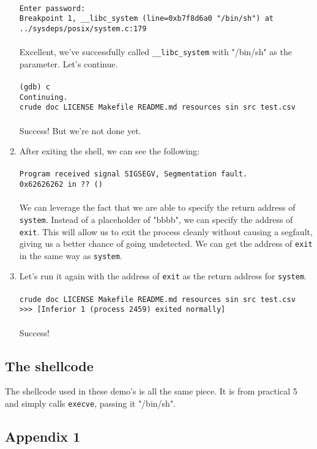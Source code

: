 \documentclass[]{article}
\begin{document}
\begin{enumerate}
	\\
	\texttt{Enter password:\\
		Breakpoint 1, \_\_libc\_system (line=0xb7f8d6a0 "/bin/sh") at \\../sysdeps/posix/system.c:179}\\\\
Excellent, we've successfully called \texttt{\_\_libc\_system} with "/bin/sh" as the parameter. Let's continue.\\\\
\texttt{(gdb) c\\
	Continuing.\\
	crude  doc  LICENSE  Makefile  README.md  resources  sin  src  test.csv}
\\
\\
Success! But we're not done yet.
\item After exiting the shell, we can see the following:\\\\
\texttt{Program received signal SIGSEGV, Segmentation fault.\\
	0x62626262 in ?? ()}\\
\\
We can leverage the fact that we are able to specify the return address of \texttt{system}. Instead of a placeholder of "bbbb", we can specify the address of \texttt{exit}. This will allow us to exit the process cleanly without causing a segfault, giving us a better chance of going undetected. We can get the address of \texttt{exit} in the same way as \texttt{system}.
\item Let's run it again with the address of \texttt{exit} as the return address for \texttt{system}.\\\\
\texttt{crude  doc  LICENSE  Makefile  README.md  resources  sin  src  test.csv\\
	>>> [Inferior 1 (process 2459) exited normally]}
\\
\\
Success!

\end{enumerate}

\subsection*{The shellcode}
The shellcode used in these demo's is all the same piece. It is from practical 5 and simply calls \texttt{execve}, passing it "/bin/sh".

\pagebreak
\begin{center}
	\section*{Appendix 1}
\end{center}


\break
\setlength\itemsep{4\itemsep}

\end{document}
